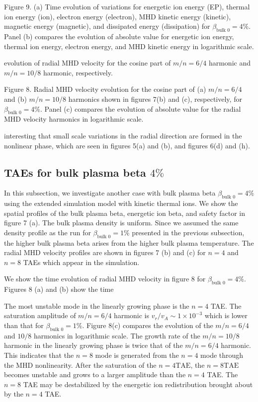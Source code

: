 \documentclass[10pt]{article}
\begin{document}
Figure 9. (a) Time evolution of variations for energetic ion energy (EP), thermal ion energy (ion), electron energy (electron), MHD kinetic energy (kinetic), magnetic energy (magnetic), and dissipated energy (dissipation) for $\beta_{\text {bulk } 0}=4 \%$. Panel (b) compares the evolution of absolute value for energetic ion energy, thermal ion energy, electron energy, and MHD kinetic energy in logarithmic scale.

evolution of radial MHD velocity for the cosine part of $m / n=6 / 4$ harmonic and $m / n=10 / 8$ harmonic, respectively.

Figure 8. Radial MHD velocity evolution for the cosine part of (a) $m / n=6 / 4$ and (b) $m / n=10 / 8$ harmonics shown in figures 7(b) and (c), respectively, for $\beta_{\text {bulk } 0}=4 \%$. Panel (c) compares the evolution of absolute value for the radial MHD velocity harmonics in logarithmic scale.

interesting that small scale variations in the radial direction are formed in the nonlinear phase, which are seen in figures 5(a) and (b), and figures 6(d) and (h).

\subsection{TAEs for bulk plasma beta $4 \%$}
In this subsection, we investigate another case with bulk plasma beta $\beta_{\text {bulk } 0}=4 \%$ using the extended simulation model with kinetic thermal ions. We show the spatial profiles of the bulk plasma beta, energetic ion beta, and safety factor in figure 7 (a). The bulk plasma density is uniform. Since we assumed the same density profile as the run for $\beta_{\text {bulk } 0}=1 \%$ presented in the previous subsection, the higher bulk plasma beta arises from the higher bulk plasma temperature. The radial MHD velocity profiles are shown in figures 7 (b) and (c) for $n=4$ and $n=8$ TAEs which appear in the simulation.

We show the time evolution of radial MHD velocity in figure 8 for $\beta_{\text {bulk } 0}=4 \%$. Figures 8 (a) and (b) show the time

The most unstable mode in the linearly growing phase is the $n=4$ TAE. The saturation amplitude of $m / n=6 / 4$ harmonic is $v_{r} / v_{A} \sim 1 \times 10^{-3}$ which is lower than that for $\beta_{\text {bulk } 0}=1 \%$. Figure 8(c) compares the evolution of the $m / n=6 / 4$ and $10 / 8$ harmonics in logarithmic scale. The growth rate of the $m / n=10 / 8$ harmonic in the linearly growing phase is twice that of the $m / n=6 / 4$ harmonic. This indicates that the $n=8$ mode is generated from the $n=4$ mode through the MHD nonlinearity. After the saturation of the $n=4 \mathrm{TAE}$, the $n=8 \mathrm{TAE}$ becomes unstable and grows to a larger amplitude than the $n=4$ TAE. The $n=8$ TAE may be destabilized by the energetic ion redistribution brought about by the $n=4$ TAE.
\end{document}
